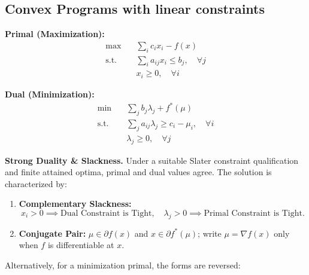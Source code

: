 \documentclass[11pt, a4paper]{article}
\begin{document}
\subsection{Convex Programs with linear constraints}

\noindent
\begin{minipage}[t]{0.48\textwidth}
    \textbf{Primal (Maximization):}
    \begin{align*}
        \max \quad & \sum_{i} c_i x_i - f(x) \\
        \text{s.t.} \quad & \sum_{i} a_{ij} x_i \leq b_j, \quad \forall j \\
                          & x_i \ge 0, \quad \forall i
    \end{align*}
\end{minipage}
\hfill \vrule{} \hfill
\begin{minipage}[t]{0.48\textwidth}
    \textbf{Dual (Minimization):}
    \begin{align*}
        \min \quad & \sum_{j} b_j \lambda_j + f^*(\mu) \\
        \text{s.t.} \quad & \sum_{j} a_{ij} \lambda_j \ge c_i - \mu_i, \quad \forall i \\
                          & \lambda_j \geq 0, \quad \forall j
    \end{align*}
\end{minipage}

\vspace{1em}
\begin{interpretation}
    \textbf{Strong Duality \& Slackness.}
    Under a suitable Slater constraint qualification and finite attained optima, primal and dual values agree. The solution is characterized by:
    \begin{enumerate}
        \item \textbf{Complementary Slackness:} 
        \[ x_i > 0 \implies \text{Dual Constraint is Tight}, \quad \lambda_j > 0 \implies \text{Primal Constraint is Tight}. \]
        \item \textbf{Conjugate Pair:} $\mu\in\partial f(x)$ and $x\in\partial f^*(\mu)$; write $\mu=\nabla f(x)$ only when $f$ is differentiable at $x$.
    \end{enumerate}
\end{interpretation}
\noindent Alternatively, for a minimization primal, the forms are reversed:
\end{document}
